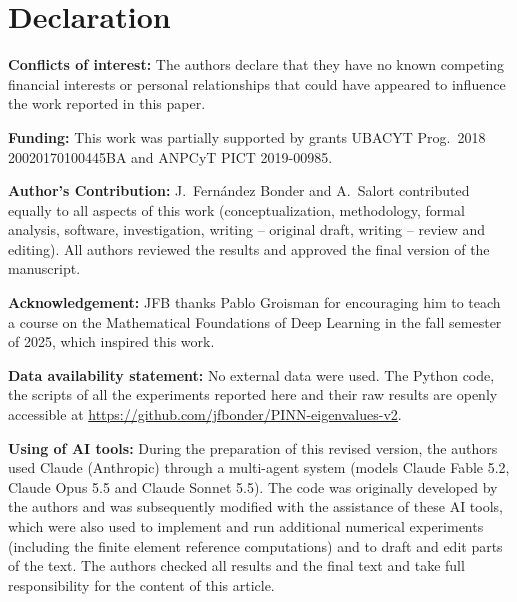 \documentclass[10pt]{amsart}
\theoremstyle{definition}
\theoremstyle{remark}
\theoremstyle{plain}
\begin{document}
\clearpage
\section*{Declaration}

\noindent\textbf{Conflicts of interest:} The authors declare that they have no known competing financial
interests or personal relationships that could have appeared to influence the work reported in this paper.

\noindent\textbf{Funding:} This work was partially supported by grants UBACYT Prog.\ 2018
20020170100445BA and ANPCyT PICT 2019-00985.

\noindent\textbf{Author's Contribution:} J.~Fern\'andez Bonder and A.~Salort contributed equally to all
aspects of this work (conceptualization, methodology, formal analysis, software, investigation,
writing -- original draft, writing -- review and editing). All authors reviewed the results and
approved the final version of the manuscript.

\noindent\textbf{Acknowledgement:} JFB thanks Pablo Groisman for encouraging him to teach a course on
the Mathematical Foundations of Deep Learning in the fall semester of 2025, which inspired this work.

\noindent\textbf{Data availability statement:} No external data were used. The Python code, the scripts
of all the experiments reported here and their raw results are openly accessible at
\url{https://github.com/jfbonder/PINN-eigenvalues-v2}.

\noindent\textbf{Using of AI tools:} During the preparation of this revised version, the authors used
Claude (Anthropic) through a multi-agent system (models Claude Fable 5.2, Claude Opus 5.5 and Claude
Sonnet 5.5). The code was originally developed by the authors and was subsequently modified with the
assistance of these AI tools, which were also used to implement and run additional numerical
experiments (including the finite element reference computations) and to draft and edit parts of the
text. The authors checked all results and the final text and take full responsibility for the content
of this article.
\end{document}
